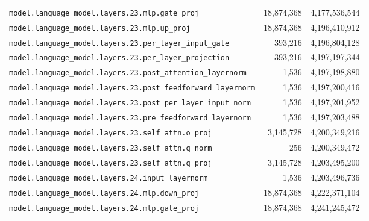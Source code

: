 \documentclass[10pt,a4paper]{article}
\theoremstyle{definition}
\begin{document}
\begin{appendices}
\begin{longtable}{p{9.5cm}rr}
\texttt{model.\allowbreak{}language\_model.\allowbreak{}layers.\allowbreak{}23.\allowbreak{}mlp.\allowbreak{}gate\_proj} & 18,874,368 & 4,177,536,544 \\
\texttt{model.\allowbreak{}language\_model.\allowbreak{}layers.\allowbreak{}23.\allowbreak{}mlp.\allowbreak{}up\_proj} & 18,874,368 & 4,196,410,912 \\
\texttt{model.\allowbreak{}language\_model.\allowbreak{}layers.\allowbreak{}23.\allowbreak{}per\_layer\_input\_gate} & 393,216 & 4,196,804,128 \\
\texttt{model.\allowbreak{}language\_model.\allowbreak{}layers.\allowbreak{}23.\allowbreak{}per\_layer\_projection} & 393,216 & 4,197,197,344 \\
\texttt{model.\allowbreak{}language\_model.\allowbreak{}layers.\allowbreak{}23.\allowbreak{}post\_attention\_layernorm} & 1,536 & 4,197,198,880 \\
\texttt{model.\allowbreak{}language\_model.\allowbreak{}layers.\allowbreak{}23.\allowbreak{}post\_feedforward\_layernorm} & 1,536 & 4,197,200,416 \\
\texttt{model.\allowbreak{}language\_model.\allowbreak{}layers.\allowbreak{}23.\allowbreak{}post\_per\_layer\_input\_norm} & 1,536 & 4,197,201,952 \\
\texttt{model.\allowbreak{}language\_model.\allowbreak{}layers.\allowbreak{}23.\allowbreak{}pre\_feedforward\_layernorm} & 1,536 & 4,197,203,488 \\
\texttt{model.\allowbreak{}language\_model.\allowbreak{}layers.\allowbreak{}23.\allowbreak{}self\_attn.\allowbreak{}o\_proj} & 3,145,728 & 4,200,349,216 \\
\texttt{model.\allowbreak{}language\_model.\allowbreak{}layers.\allowbreak{}23.\allowbreak{}self\_attn.\allowbreak{}q\_norm} & 256 & 4,200,349,472 \\
\texttt{model.\allowbreak{}language\_model.\allowbreak{}layers.\allowbreak{}23.\allowbreak{}self\_attn.\allowbreak{}q\_proj} & 3,145,728 & 4,203,495,200 \\
\texttt{model.\allowbreak{}language\_model.\allowbreak{}layers.\allowbreak{}24.\allowbreak{}input\_layernorm} & 1,536 & 4,203,496,736 \\
\texttt{model.\allowbreak{}language\_model.\allowbreak{}layers.\allowbreak{}24.\allowbreak{}mlp.\allowbreak{}down\_proj} & 18,874,368 & 4,222,371,104 \\
\texttt{model.\allowbreak{}language\_model.\allowbreak{}layers.\allowbreak{}24.\allowbreak{}mlp.\allowbreak{}gate\_proj} & 18,874,368 & 4,241,245,472 \\

\end{longtable}
\end{appendices}
\end{document}

